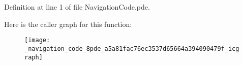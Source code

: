 \-Definition at line 1 of file \-Navigation\-Code.\-pde.



\-Here is the caller graph for this function\-:\nopagebreak
\begin{figure}[H]
\begin{center}
\leavevmode
\texttt{[image: \_navigation\_code\_8pde\_a5a81fac76ec3537d65664a394090479f\_icgraph]}
\end{center}
\end{figure}



